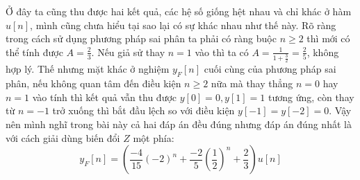 \documentclass{article}
\begin{document}
Ở đây ta cũng thu được hai kết quả, các hệ số giống hệt nhau và chỉ khác ở hàm $u[n]$, mình cũng chưa hiểu tại sao lại có sự khác nhau như thế này. Rõ ràng trong cách sử dụng phương pháp sai phân ta phải có ràng buộc $n\geq2$ thì mới có thể tính được $A=\frac{2}{3}$. Nếu giả sử thay $n=1$ vào thì ta có $A=\frac{1}{1+\frac{3}{2}}=\frac{2}{5}$, không hợp lý.
Thế nhưng  mặt khác ở nghiệm $y_{F}[n]$ cuối cùng của phương pháp sai phân, nếu không quan tâm đến điều kiện $n\geq2$ nữa mà thay thẳng $n=0$ hay $n=1$ vào tính thì kết quả vẫn thu được $y[0]=0, y[1]=1$ tương ứng, còn thay từ $n=-1$ trở xuống thì bắt đầu lệch so với điều kiện $y[-1]=y[-2]=0$. Vậy nên mình nghĩ trong
bài này cả hai đáp án đều đúng nhưng đáp án đúng nhất là với cách giải dùng biến đổi $Z$ một phía:
$$y_{F}[n]=\left(\frac{-4}{15}(-2)^{n}+\frac{-2}{5}\left(\frac{1}{2}\right)^{n}+\frac{2}{3}\right)u[n]$$
\end{document}

